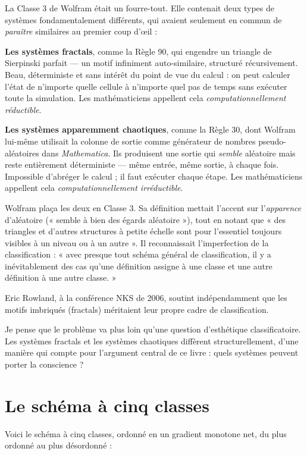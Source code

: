 \documentclass[11pt, twoside, openright]{book}
\begin{document}
La Classe 3 de Wolfram était un fourre-tout. Elle contenait deux types de systèmes fondamentalement différents, qui avaient seulement en commun de \textit{paraître} similaires au premier coup d'œil :

\textbf{Les systèmes fractals}, comme la Règle 90, qui engendre un triangle de Sierpinski parfait --- un motif infiniment auto-similaire, structuré récursivement. Beau, déterministe et sans intérêt du point de vue du calcul : on peut calculer l'état de n'importe quelle cellule à n'importe quel pas de temps sans exécuter toute la simulation. Les mathématiciens appellent cela \textit{computationnellement réductible}.

\textbf{Les systèmes apparemment chaotiques}, comme la Règle 30, dont Wolfram lui-même utilisait la colonne de sortie comme générateur de nombres pseudo-aléatoires dans \textit{Mathematica}. Ils produisent une sortie qui \textit{semble} aléatoire mais reste entièrement déterministe --- même entrée, même sortie, à chaque fois. Impossible d'abréger le calcul ; il faut exécuter chaque étape. Les mathématiciens appellent cela \textit{computationnellement irréductible}.

Wolfram plaça les deux en Classe 3. Sa définition mettait l'accent sur l'\textit{apparence} d'aléatoire (« semble à bien des égards aléatoire »), tout en notant que « des triangles et d'autres structures à petite échelle sont pour l'essentiel toujours visibles à un niveau ou à un autre ». Il reconnaissait l'imperfection de la classification : « avec presque tout schéma général de classification, il y a inévitablement des cas qu'une définition assigne à une classe et une autre définition à une autre classe. »

Eric Rowland, à la conférence NKS de 2006, soutint indépendamment que les motifs imbriqués (fractals) méritaient leur propre cadre de classification.

Je pense que le problème va plus loin qu'une question d'esthétique classificatoire. Les systèmes fractals et les systèmes chaotiques diffèrent structurellement, d'une manière qui compte pour l'argument central de ce livre : quels systèmes peuvent porter la conscience ?

\section*{Le schéma à cinq classes}

Voici le schéma à cinq classes, ordonné en un gradient monotone net, du plus ordonné au plus désordonné :
\end{document}
